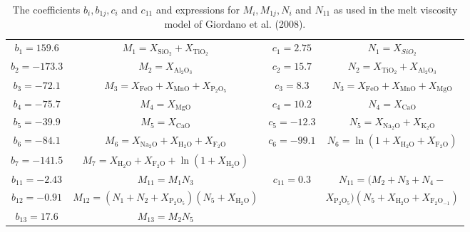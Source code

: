 \documentclass[]{book}
\theoremstyle{definition}
\begin{document}
\begin{enumerate}
  \begin{table}
    \caption{The coefficients $b_{i}, b_{1j}, c_{i}$ and $c_{11}$ and expressions for $M_{i}, M_{1j}, N_{i}$ and $N_{11}$ as used in the melt viscosity model of Giordano et al. (2008). \label{tab:viscos}}
    \begin{tabular}{|c|c||c|c|}
      \hline
      $b_{1} = 159.6$ & $M_{1} = X_{\text{SiO}_{2}} + X_{\text{TiO}_{2}}$ & $c_{1} = 2.75$ & $N_{1} = X_{SiO_{2}}$ \\
      $b_{2} = -173.3$ & $M_{2} = X_{\text{Al}_{2}\text{O}_{3}}$ & $c_{2} = 15.7$ & $N_{2} = X_{\text{TiO}_{2}} + X_{\text{Al}_{2}\text{O}_{3}}$ \\
      $b_{3} = -72.1$ & $M_{3} = X_{\text{FeO}} + X_{\text{MnO}} + X_{\text{P}_{2}\text{O}_{5}}$ & $c_{3} = 8.3$ & $N_{3} = X_{\text{FeO}} + X_{\text{MnO}} + X_{\text{MgO}}$ \\
      $b_{4} = -75.7$ & $M_{4} = X_{\text{MgO}}$ & $c_{4} = 10.2$ & $N_{4} = X_{\text{CaO}}$ \\
      $b_{5} = -39.9$ & $M_{5} = X_{\text{CaO}}$ & $c_{5} = -12.3$ & $N_{5} = X_{\text{Na}_{2}\text{O}} + X_{\text{K}_{2}\text{O}}$ \\
      $b_{6} = -84.1$ & $M_{6} = X_{\text{Na}_{2}\text{O}} + X_{\text{H}_{2}\text{O}} + X_{\text{F}_{2}\text{O}}$ & $c_{6} = -99.1$ & $N_{6} = \ln(1 + X_{\text{H}_{2}\text{O}} + X_{\text{F}_{2}\text{O}})$ \\
      $b_{7} = -141.5$ & $M_{7} = X_{\text{H}_{2}\text{O}} + X_{\text{F}_{2}\text{O}} + \ln(1 + X_{\text{H}_{2}\text{O}})$& &  \\
      \hline
      $b_{11} = -2.43$ & $M_{11} = M_{1} N_{3}$ & $c_{11} = 0.3$& $N_{11} = (M_{2} + N_{3} + N_{4} - $\\
      $b_{12} = -0.91$ & $M_{12} = (N_{1} + N_{2} + X_{\text{P}_{2}\text{O}_{5}}) (N_{5} + X_{\text{H}_{2}\text{O}})$ & & $X_{\text{P}_{2}\text{O}_{5}}) (N_{5} + X_{\text{H}_{2}\text{O}} + X_{\text{F}_{2}\text{O}_{-1}})$ \\
      $b_{13} = 17.6$ & $M_{13} = M_{2} N_{5}$ & &  \\    
      \hline
    \end{tabular}
  \end{table}


\end{enumerate}
\end{document}
